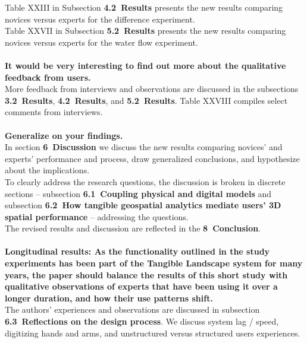 \documentclass[prodmode,acmtochi]{acmsmall} %
\begin{document}
Table XXIII in Subsection \textbf{4.2~Results}
presents the new results comparing novices versus experts
for the difference experiment. \\

Table XXVII in Subsection \textbf{5.2~Results}
presents the new results comparing novices versus experts
for the water flow experiment.  \\

\hrulefill \\

\textbf{It would be very interesting to find out more 
about the qualitative feedback from users.} \\

More feedback from interviews and observations are discussed in the subsections \textbf{3.2~Results}, \textbf{4.2~Results}, and \textbf{5.2~Results}.
Table XXVIII compiles select comments from interviews. \\

\hrulefill \\

\textbf{Generalize on your findings.}\\

In section \textbf{6~Discussion}
we discuss the new results 
comparing novices' and experts' performance and process, 
draw generalized conclusions, and 
hypothesize about the implications. \\

To clearly address the research questions, the discussion
is broken in discrete sections -- 
subsection \textbf{6.1~Coupling physical and digital models}
and 
subsection \textbf{6.2~How tangible geospatial analytics mediate users’ 3D spatial performance} 
-- addressing the questions. \\

The revised results and discussion are reflected in the \textbf{8~Conclusion}.\\

\hrulefill \\

\textbf{Longitudinal results: As the functionality outlined in the study experiments has been part of the Tangible Landscape system for many years, the paper should balance the results of this short study with qualitative observations of experts that have been using it over a longer duration, and how their use patterns shift.}\\

The authors' experiences and observations are discussed in 
subsection \textbf{6.3~Reflections on the design process}.
We discuss system lag / speed, digitizing hands and arms,
and unstructured versus structured users experiences. \\
\end{document}
